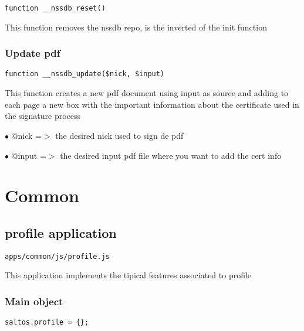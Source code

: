 \documentclass[a4paper]{article}
\begin{document}
\begin{lstlisting}
function __nssdb_reset()
\end{lstlisting}

This function removes the nssdb repo, is the inverted of the init function

\hypertarget{toc19}{}
\subsubsection{Update pdf}

\begin{lstlisting}
function __nssdb_update($nick, $input)
\end{lstlisting}

This function creates a new pdf document using input as source and adding to
each page a new box with the important information about the certificate used
in the signature process

\begin{compactitem}
\item[\color{myblue}$\bullet$] @nick  =$>$ the desired nick used to sign de pdf
\item[\color{myblue}$\bullet$] @input =$>$ the desired input pdf file where you want to add the cert info
\end{compactitem}


\hypertarget{toc20}{}
\section{Common}

\hypertarget{toc21}{}
\subsection{profile application}

\begin{lstlisting}
apps/common/js/profile.js
\end{lstlisting}

This application implements the tipical features associated to profile

\hypertarget{toc22}{}
\subsubsection{Main object}

\begin{lstlisting}
saltos.profile = {};
\end{lstlisting}
\end{document}
